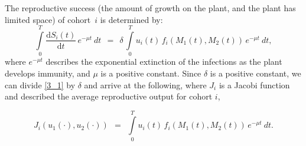 \documentclass[11pt]{amsart}
\begin{document}
The reproductive success (the amount of growth on the plant, and the plant has limited space) of cohort~$ i $ is determined by:
\begin{equation}
\int\limits_0^T \frac{\mathrm{d} S_i(t)}{\mathrm{d} t} \, e^{-\mu t}
    \: dt \:\: = \:\: \delta \,
\int\limits_0^T u_i(t) \, f_i\left(M_1(t), M_2(t)\right) \, e^{-\mu t} \: dt,  \label{3_1}
\end{equation}
where $ e^{-\mu t} $ describes the exponential extinction of the infections as the plant develops immunity,
and $ \mu $ is a positive constant. Since $ \delta $ is a positive constant,
we can divide \cref{3_1} by $ \delta $ and arrive at the following, where $J_i$ is a Jacobi function and described the average reproductive output for cohort $i$, 

\begin{equation}
J_i\left(u_1(\cdot), u_2(\cdot)\right) \:\: = \:\: \int\limits_0^T u_i(t) \, f_i\left(M_1(t),
  M_2(t)\right) \, e^{-\mu t} \: dt.  \label{3}
\end{equation}
\end{document}
